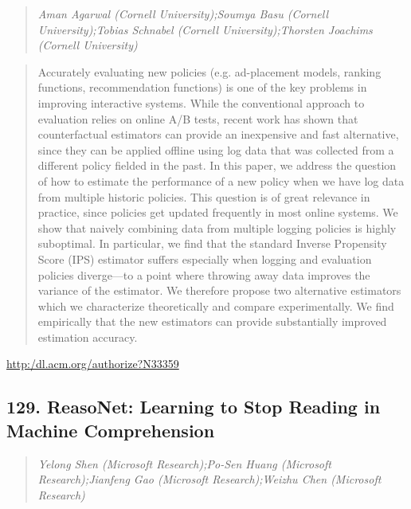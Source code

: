 \documentclass{article}
\begin{document}
\begin{quote}
\footnotesize{\textit{Aman Agarwal (Cornell University);Soumya Basu (Cornell University);Tobias Schnabel (Cornell University);Thorsten Joachims (Cornell University)}}

\end{quote}

\begin{quote}
Accurately evaluating new policies (e.g. ad-placement models, ranking functions, recommendation functions) is one of the key problems in improving interactive systems. While the conventional approach to evaluation relies on online A/B tests, recent work has shown that counterfactual estimators can provide an inexpensive and fast alternative, since they can be applied offline using log data that was collected from a different policy fielded in the past. In this paper, we address the question of how to estimate the performance of a new policy when we have log data from multiple historic policies. This question is of great relevance in practice, since policies get updated frequently in most online systems. We show that naively combining data from multiple logging policies is highly suboptimal. In particular, we find that the standard Inverse Propensity Score (IPS) estimator suffers especially when logging and evaluation policies diverge—to a point where throwing away data improves the variance of the estimator. We therefore propose two alternative estimators which we characterize theoretically and compare experimentally. We find empirically that the new estimators can provide substantially improved estimation accuracy.
\end{quote}

\href{http:/dl.acm.org/authorize?N33359}{http:/dl.acm.org/authorize?N33359}

\subsection{129. ReasoNet: Learning to Stop Reading in Machine Comprehension}

\begin{quote}
\footnotesize{\textit{Yelong Shen (Microsoft Research);Po-Sen Huang (Microsoft Research);Jianfeng Gao (Microsoft Research);Weizhu Chen (Microsoft Research)}}

\end{quote}
\end{document}

